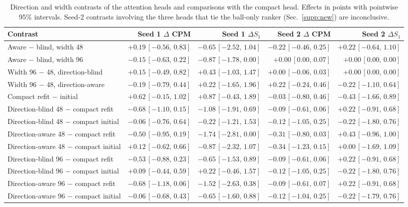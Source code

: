 \begin{table}[!t]
\centering
\footnotesize\setlength{\tabcolsep}{4pt}
\caption{Direction and width contrasts of the attention heads and comparisons with the compact head. Effects in points with pointwise 95\% intervals. Seed-2 contrasts involving the three heads that tie the ball-only ranker (Sec.~\ref{supp:new}) are inconclusive.}
\label{tab:attention_contrasts}
\begin{tabular}{@{}lrrrr@{}}
\toprule
Contrast & Seed 1 $\Delta$ CPM & Seed 1 $\Delta S_1$ & Seed 2 $\Delta$ CPM & Seed 2 $\Delta S_1$ \\
\midrule
Aware $-$ blind, width 48 & $+0.19\,[-0.56,\,0.83]$ & $-0.65\,[-2.52,\,1.04]$ & $-0.22\,[-0.46,\,0.25]$ & $+0.22\,[-0.64,\,1.10]$ \\
Aware $-$ blind, width 96 & $-0.15\,[-0.63,\,0.22]$ & $-0.87\,[-1.78,\,0.00]$ & $+0.00\,[0.00,\,0.07]$ & $+0.00\,[0.00,\,0.00]$ \\
Width 96 $-$ 48, direction-blind & $+0.15\,[-0.49,\,0.82]$ & $+0.43\,[-1.03,\,1.47]$ & $+0.00\,[-0.06,\,0.03]$ & $+0.00\,[0.00,\,0.00]$ \\
Width 96 $-$ 48, direction-aware & $-0.19\,[-0.79,\,0.44]$ & $+0.22\,[-1.65,\,1.96]$ & $+0.22\,[-0.24,\,0.46]$ & $-0.22\,[-1.10,\,0.64]$ \\
Compact refit $-$ initial & $+0.62\,[-0.15,\,1.02]$ & $+0.87\,[-0.43,\,1.89]$ & $-0.03\,[-0.80,\,0.46]$ & $-0.43\,[-1.66,\,0.89]$ \\
Direction-blind 48 $-$ compact refit & $-0.68\,[-1.10,\,0.15]$ & $-1.08\,[-1.91,\,0.69]$ & $-0.09\,[-0.61,\,0.06]$ & $+0.22\,[-0.91,\,0.68]$ \\
Direction-blind 48 $-$ compact initial & $-0.06\,[-0.76,\,0.64]$ & $-0.22\,[-1.21,\,1.53]$ & $-0.12\,[-1.05,\,0.25]$ & $-0.22\,[-1.80,\,0.76]$ \\
Direction-aware 48 $-$ compact refit & $-0.50\,[-0.95,\,0.19]$ & $-1.74\,[-2.81,\,0.00]$ & $-0.31\,[-0.80,\,0.03]$ & $+0.43\,[-0.96,\,1.00]$ \\
Direction-aware 48 $-$ compact initial & $+0.12\,[-0.62,\,0.66]$ & $-0.87\,[-2.32,\,1.07]$ & $-0.34\,[-1.23,\,0.15]$ & $+0.00\,[-1.69,\,1.09]$ \\
Direction-blind 96 $-$ compact refit & $-0.53\,[-0.88,\,0.23]$ & $-0.65\,[-1.53,\,0.89]$ & $-0.09\,[-0.61,\,0.06]$ & $+0.22\,[-0.91,\,0.68]$ \\
Direction-blind 96 $-$ compact initial & $+0.09\,[-0.44,\,0.59]$ & $+0.22\,[-0.46,\,1.57]$ & $-0.12\,[-1.05,\,0.25]$ & $-0.22\,[-1.80,\,0.76]$ \\
Direction-aware 96 $-$ compact refit & $-0.68\,[-1.18,\,0.06]$ & $-1.52\,[-2.63,\,0.38]$ & $-0.09\,[-0.61,\,0.07]$ & $+0.22\,[-0.91,\,0.68]$ \\
Direction-aware 96 $-$ compact initial & $-0.06\,[-0.68,\,0.43]$ & $-0.65\,[-1.60,\,0.88]$ & $-0.12\,[-1.04,\,0.25]$ & $-0.22\,[-1.79,\,0.76]$ \\
\bottomrule
\end{tabular}
\end{table}
